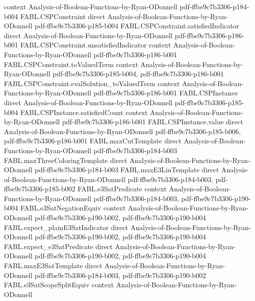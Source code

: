 \begin{theorem}
  {context}
  {Analysis-of-Boolean-Functions-by-Ryan-ODonnell}
  {pdf-ffbe9c7b3306-p184-b004}
\proofstep
  {FABL.CSPConstraint}
  {direct}
  {Analysis-of-Boolean-Functions-by-Ryan-ODonnell}
  {pdf-ffbe9c7b3306-p185-b004}
\proofstep
  {FABL.CSPConstraint.satisfiedIndicator}
  {direct}
  {Analysis-of-Boolean-Functions-by-Ryan-ODonnell}
  {pdf-ffbe9c7b3306-p186-b001}
\proofstep
  {FABL.CSPConstraint.unsatisfiedIndicator}
  {context}
  {Analysis-of-Boolean-Functions-by-Ryan-ODonnell}
  {pdf-ffbe9c7b3306-p186-b001}
\proofstep
  {FABL.CSPConstraint.toValuedTerm}
  {context}
  {Analysis-of-Boolean-Functions-by-Ryan-ODonnell}
  {pdf-ffbe9c7b3306-p185-b004,
    pdf-ffbe9c7b3306-p186-b001}
\proofstep
  {FABL.CSPConstraint.evalSolution_toValuedTerm}
  {context}
  {Analysis-of-Boolean-Functions-by-Ryan-ODonnell}
  {pdf-ffbe9c7b3306-p186-b001}
\proofstep
  {FABL.CSPInstance}
  {direct}
  {Analysis-of-Boolean-Functions-by-Ryan-ODonnell}
  {pdf-ffbe9c7b3306-p185-b004}
\proofstep
  {FABL.CSPInstance.satisfiedCount}
  {context}
  {Analysis-of-Boolean-Functions-by-Ryan-ODonnell}
  {pdf-ffbe9c7b3306-p186-b001}
\proofstep
  {FABL.CSPInstance.value}
  {direct}
  {Analysis-of-Boolean-Functions-by-Ryan-ODonnell}
  {pdf-ffbe9c7b3306-p185-b006,
    pdf-ffbe9c7b3306-p186-b001}
\proofstep
  {FABL.maxCutTemplate}
  {direct}
  {Analysis-of-Boolean-Functions-by-Ryan-ODonnell}
  {pdf-ffbe9c7b3306-p184-b003}
\proofstep
  {FABL.maxThreeColoringTemplate}
  {direct}
  {Analysis-of-Boolean-Functions-by-Ryan-ODonnell}
  {pdf-ffbe9c7b3306-p184-b003}
\proofstep
  {FABL.maxE3LinTemplate}
  {direct}
  {Analysis-of-Boolean-Functions-by-Ryan-ODonnell}
  {pdf-ffbe9c7b3306-p184-b003,
    pdf-ffbe9c7b3306-p185-b002}
\proofstep
  {FABL.e3SatPredicate}
  {context}
  {Analysis-of-Boolean-Functions-by-Ryan-ODonnell}
  {pdf-ffbe9c7b3306-p184-b003,
    pdf-ffbe9c7b3306-p190-b004}
\proofstep
  {FABL.e3SatNegationEquiv}
  {context}
  {Analysis-of-Boolean-Functions-by-Ryan-ODonnell}
  {pdf-ffbe9c7b3306-p190-b002,
    pdf-ffbe9c7b3306-p190-b004}
\proofstep
  {FABL.expect_plainE3SatIndicator}
  {direct}
  {Analysis-of-Boolean-Functions-by-Ryan-ODonnell}
  {pdf-ffbe9c7b3306-p190-b002,
    pdf-ffbe9c7b3306-p190-b004}
\proofstep
  {FABL.expect_e3SatPredicate}
  {direct}
  {Analysis-of-Boolean-Functions-by-Ryan-ODonnell}
  {pdf-ffbe9c7b3306-p190-b002,
    pdf-ffbe9c7b3306-p190-b004}
\proofstep
  {FABL.maxE3SatTemplate}
  {direct}
  {Analysis-of-Boolean-Functions-by-Ryan-ODonnell}
  {pdf-ffbe9c7b3306-p184-b003,
    pdf-ffbe9c7b3306-p190-b002}
\proofstep
  {FABL.e3SatScopeSplitEquiv}
  {context}
  {Analysis-of-Boolean-Functions-by-Ryan-ODonnell}

\end{theorem}
